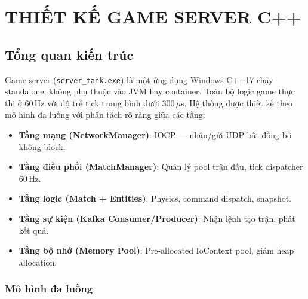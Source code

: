 \documentclass[12pt,a4paper]{report}
\begin{document}
\chapter{THIẾT KẾ GAME SERVER C++}

\section{Tổng quan kiến trúc}

Game server (\texttt{server\_tank.exe}) là một ứng dụng Windows C++17 chạy standalone, không phụ thuộc vào JVM hay container. Toàn bộ logic game thực thi ở 60\,Hz với độ trễ tick trung bình dưới 300\,$\mu$s. Hệ thống được thiết kế theo mô hình đa luồng với phân tách rõ ràng giữa các tầng:

\begin{itemize}
  \item \textbf{Tầng mạng (NetworkManager)}: IOCP --- nhận/gửi UDP bất đồng bộ không block.
  \item \textbf{Tầng điều phối (MatchManager)}: Quản lý pool trận đấu, tick dispatcher 60\,Hz.
  \item \textbf{Tầng logic (Match + Entities)}: Physics, command dispatch, snapshot.
  \item \textbf{Tầng sự kiện (Kafka Consumer/Producer)}: Nhận lệnh tạo trận, phát kết quả.
  \item \textbf{Tầng bộ nhớ (Memory Pool)}: Pre-allocated IoContext pool, giảm heap allocation.
\end{itemize}

\subsection{Mô hình đa luồng}
\end{document}
